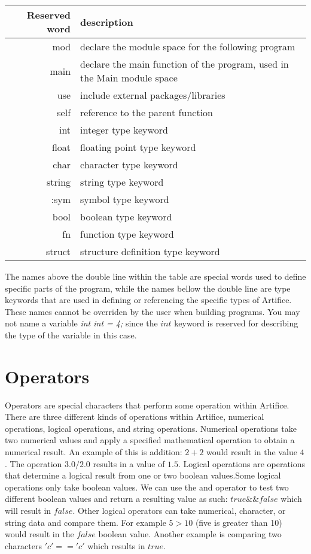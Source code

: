 \documentclass{article}
\begin{document}
\begin{center}
\begin{tabular}{|r|l|}
\hline
Reserved word & description \\
\hline
\hline
mod & declare the module space for the following program \\
main & declare the main function of the program, used in the Main module space \\
use & include external packages/libraries \\
self & reference to the parent function \\
\hline
\hline
int & integer type keyword \\
float & floating point type keyword \\
char & character type keyword \\
string & string type keyword \\
:sym & symbol type keyword \\
bool & boolean type keyword \\
fn & function type keyword \\
struct & structure definition type keyword \\
\hline
\end{tabular}
\end{center}

The names above the double line within the table are special words used to define specific parts of the program, while the names bellow the double line are type keywords that
are used in defining or referencing the specific types of Artifice. These names cannot be overriden by the user when building programs. You may not name a variable
\textit{int int = 4;} since the $int$ keyword is reserved for describing the type of the variable in this case.

\section{Operators}

Operators are special characters that perform some operation within Artifice. There are three different kinds of operations within Artifice, numerical operations, logical operations,
and string operations. Numerical operations take two numerical values and apply a specified mathematical operation to obtain a numerical result. An example of this is addition:
$2 + 2$ would result in the value $4$. The operation $3.0 / 2.0$ results in a value of $1.5$. Logical operations are operations that determine a logical result from one or two
boolean values.Some logical operations only take boolean values. We can use the and operator to test two different boolean values and return a resulting value as such: $true \&\& false$
which will result in $false$. Other logical operators can take numerical, character, or string data and compare them. For example $5 > 10$ (five is greater than 10) would result in
the $false$ boolean value. Another example is comparing two characters $'c' == 'c'$ which results in $true$.
\end{document}
